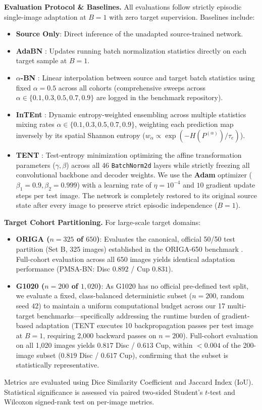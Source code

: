 \documentclass[11pt,a4paper]{article}
\begin{document}
\noindent\textbf{Evaluation Protocol \& Baselines.} All evaluations follow strictly episodic single-image adaptation at $B=1$ with zero target supervision. Baselines include:
\begin{itemize}[leftmargin=1.2em,itemsep=1pt]
\item \textbf{Source Only}: Direct inference of the unadapted source-trained network.
\item \textbf{AdaBN} \cite{li2016revisiting}: Updates running batch normalization statistics directly on each target sample at $B=1$.
\item \textbf{$\alpha$-BN} \cite{schneider2020improving}: Linear interpolation between source and target batch statistics using fixed $\alpha=0.5$ across all cohorts (comprehensive sweeps across $\alpha \in \{0.1, 0.3, 0.5, 0.7, 0.9\}$ are logged in the benchmark repository).
\item \textbf{InTEnt} \cite{wang2021intent}: Dynamic entropy-weighted ensembling across multiple statistics mixing rates $\alpha \in \{0.1, 0.3, 0.5, 0.7, 0.9\}$, weighting each prediction map inversely by its spatial Shannon entropy ($w_\alpha \propto \exp(-H(P^{(\alpha)})/\tau_e)$).
\item \textbf{TENT} \cite{wang2021tent}: Test-entropy minimization optimizing the affine transformation parameters ($\gamma, \beta$) across all 46 \texttt{BatchNorm2d} layers while strictly freezing all convolutional backbone and decoder weights. We use the \textbf{Adam} optimizer ($\beta_1=0.9, \beta_2=0.999$) with a learning rate of $\eta = 10^{-4}$ and $10$ gradient update steps per test image. The network is completely restored to its original source state after every image to preserve strict episodic independence ($B=1$).
\end{itemize}

\noindent\textbf{Target Cohort Partitioning.} For large-scale target domains:
\begin{itemize}[leftmargin=1.2em,itemsep=1pt]
\item \textbf{ORIGA ($n = 325$ of $650$)}: Evaluates the canonical, official 50/50 test partition (Set B, 325 images) established in the ORIGA-650 benchmark \cite{zhang2010origa}. Full-cohort evaluation across all 650 images yields identical adaptation performance (PMSA-BN: Disc $0.892$ / Cup $0.831$).
\item \textbf{G1020 ($n = 200$ of $1{,}020$)}: As G1020 has no official pre-defined test split, we evaluate a fixed, class-balanced deterministic subset ($n = 200$, random seed $42$) to maintain a uniform computational budget across our 17 multi-target benchmarks—specifically addressing the runtime burden of gradient-based adaptation (TENT executes 10 backpropagation passes per test image at $B=1$, requiring 2,000 backward passes on $n=200$). Full-cohort evaluation on all 1,020 images yields $0.817$ Disc / $0.613$ Cup, within $<0.004$ of the 200-image subset ($0.819$ Disc / $0.617$ Cup), confirming that the subset is statistically representative.
\end{itemize}
Metrics are evaluated using Dice Similarity Coefficient and Jaccard Index (IoU). Statistical significance is assessed via paired two-sided Student's $t$-test and Wilcoxon signed-rank test on per-image metrics.
\end{document}
